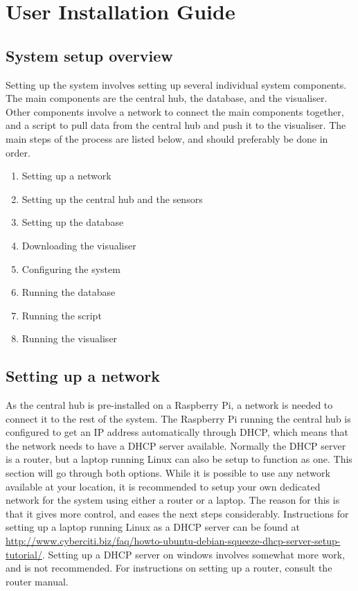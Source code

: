 \documentclass[../document.tex]{subfiles}
\begin{document}
\section{User Installation Guide}

\subsection{System setup overview}
Setting up the system involves setting up several individual system components. The main components are the central hub, the database, and the visualiser. Other components involve a network to connect the main components together, and a script to pull data from the central hub and push it to the visualiser. The main steps of the process are listed below, and should preferably be done in order.
\begin{enumerate}
\item Setting up a network

\item Setting up the central hub and the sensors

\item Setting up the database

\item Downloading the visualiser

\item Configuring the system

\item Running the database
\item Running the script
\item Running the visualiser
\end{enumerate}



\subsection{Setting up a network}
As the central hub is pre-installed on a \gls{Raspberry Pi}, a network is needed to connect it to the rest of the system. The \gls{Raspberry Pi} running the central hub is configured to get an IP address automatically through \gls{DHCP}, which means that the network needs to have a \gls{DHCP} server available. Normally the \gls{DHCP} server is a router, but a laptop running Linux can also be setup to function as one. This section will go through both options. While it is possible to use any network available at your location, it is recommended to setup your own dedicated network for the system using either a router or a laptop. The reason for this is that it gives more control, and eases the next steps considerably. Instructions for setting up a laptop running Linux as a \gls{DHCP} server can be found at \url{http://www.cyberciti.biz/faq/howto-ubuntu-debian-squeeze-dhcp-server-setup-tutorial/}. Setting up a \gls{DHCP} server on windows involves somewhat more work, and is not recommended. For instructions on setting up a router, consult the router manual.
\end{document}
